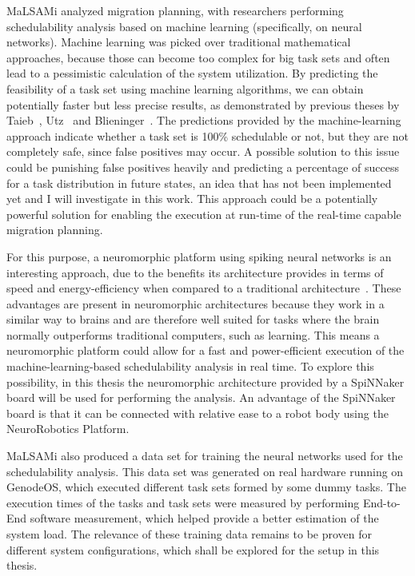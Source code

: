 MaLSAMi analyzed migration planning, with researchers performing schedulability analysis based on machine learning (specifically, on neural networks). Machine learning was picked over traditional mathematical approaches, because those can become too complex for big task sets and often lead to a pessimistic calculation of the system utilization. By predicting the feasibility of a task set using machine learning algorithms, we can obtain potentially faster but less precise results, as demonstrated by previous theses by Taieb~\parencite{taieb1}, Utz~\parencite{utz1} and Blieninger~\parencite{blieninger1}. The predictions provided by the machine-learning approach indicate whether a task set is 100\% schedulable or not, but they are not completely safe, since false positives may occur. A possible solution to this issue could be punishing false positives heavily and predicting a percentage of success for a task distribution in future states, an idea that has not been implemented yet and I will investigate in this work. This approach could be a potentially powerful solution for enabling the execution at run-time of the real-time capable migration planning.

For this purpose, a neuromorphic platform using spiking neural networks is an interesting approach, due to the benefits its architecture provides in terms of speed and energy-efficiency when compared to a traditional architecture~\parencite{bersuker1}. These advantages are present in neuromorphic architectures because they work in a similar way to brains and are therefore well suited for tasks where the brain normally outperforms traditional computers, such as learning. This means a neuromorphic platform could allow for a fast and power-efficient execution of the machine-learning-based schedulability analysis in real time. To explore this possibility, in this thesis the neuromorphic architecture provided by a SpiNNaker board will be used for performing the analysis. An advantage of the SpiNNaker board is that it can be connected with relative ease to a robot body using the NeuroRobotics Platform.

MaLSAMi also produced a data set for training the neural networks used for the schedulability analysis. This data set was generated on real hardware running on GenodeOS, which executed different task sets formed by some dummy tasks. The execution times of the tasks and task sets were measured by performing End-to-End software measurement, which helped provide a better estimation of the system load. The relevance of these training data remains to be proven for different system configurations, which shall be explored for the setup in this thesis.


